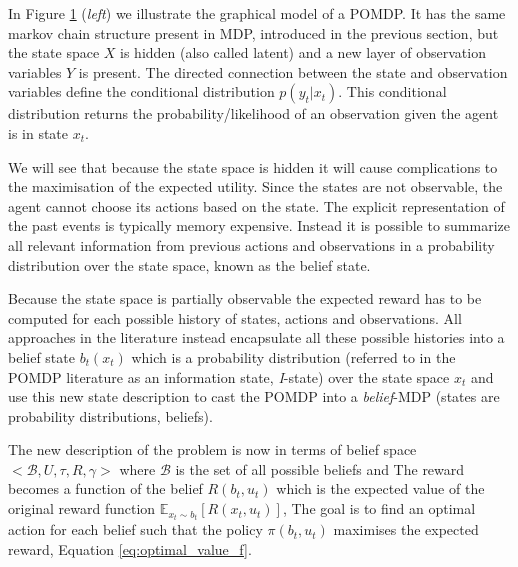 
In Figure \ref{fig:pomdp} (\textit{left}) we illustrate the graphical model of a POMDP. It has the same markov chain structure 
present in MDP, introduced in the previous section, but the state space $X$ is hidden (also called latent) and 
a new layer of observation variables $Y$ is present. The directed connection between the state and observation variables 
define the conditional distribution $p(y_t|x_t)$. This conditional distribution returns the probability/likelihood of
an observation given the agent is in state $x_t$. 

\begin{figure}[h]
 \centering
  \centering
  \caption{}
  \label{fig:pomdp}
\end{figure}

We will see that because the state space is hidden it will cause complications to the maximisation of the expected utility.
Since the states are not observable, the agent cannot choose its actions based on the state. The explicit 
representation of the past events is typically memory expensive. Instead it is possible to summarize all relevant 
information from previous actions and observations in a probability distribution over the state space, known as the
belief state. 

Because the state space is partially observable the expected reward has to be computed for each possible history of states, actions and observations.
All approaches in the literature instead encapsulate all these possible histories into a belief state $b_t(x_t)$ which is a 
probability distribution (referred to in the POMDP literature as an information state, \textit{I}-state) over the state space $x_t$ and use this 
new state description to cast the POMDP into a \textit{belief}-MDP (states are probability distributions, beliefs). 

The new description of the problem is now in terms of belief space $<\mathcal{B},U,\tau,R,\gamma>$ where $\mathcal{B}$ is the set of 
all possible beliefs and 
The reward becomes a function of the belief $R(b_t,u_t)$ which is the expected value of the original reward 
function $\mathbb{E}_{x_t \sim b_t}[R(x_t,u_t)]$, The goal is to find an optimal action for each belief such that 
the policy $\pi(b_t,u_t)$ maximises the expected reward, Equation \ref{eq:optimal_value_f}.


